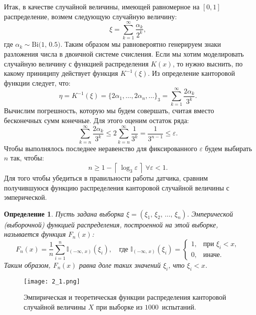 \documentclass[a4paper, 11pt]{article}
\theoremstyle{def}
\newtheorem{definition}{Определение}[section]
\theoremstyle{th}
\theoremstyle{rem}
\begin{document}
Итак, в качестве случайной величины, имеющей равномерное на $[0, 1]$ распределение, возмем следующую случайную величину:
$$
\xi = \sum\limits_{k=1}^{\infty}\frac{\alpha_k}{2^k},
$$
где $\alpha_k \sim \mbox{Bi(1, 0.5)}$. Таким образом мы равновероятно генерируем знаки разложения числа в двоичной системе счисления. Если мы хотим моделировать случайную величину с функцией распределения $K(x)$, то нужно выснить, по какому приниципу действует функция $K^{-1}(\xi)$. Из определение канторовой функции следует, что:
$$
\eta = K^{-1}(\xi) = \{2\alpha_1, \ldots, 2\alpha_n, \ldots\}_3 = \sum\limits_{k=1}^{\infty}\frac{2 \alpha_k}{3^k}.
$$
Вычислим погрешность, которую мы будем совершать, считая вместо бесконечных сумм конечные. Для этого оценим остаток ряда:
$$
        \sum_{k=n}^{\infty} \frac{2\alpha_k}{3^k} \leqslant 2\sum_{k=n}^{\infty}\frac{1}{3^k} = \frac{1}{3^{n-1}} \leqslant \varepsilon.
$$
Чтобы выполнялось последнее неравенство для фиксированного $\varepsilon$ будем выбирать $n$ так, чтобы:
$$
        n \geqslant 1 - \left\lceil\,\log_3 \varepsilon\,\right\rceil \; \forall \varepsilon < 1.
$$
Для того чтобы убедиться в правильности работы датчика, сравним получившуюся функцию распределения канторовой случайной величины с эмперической.
\begin{definition}
        Пусть задана выборка $\xi = (\xi_1,\,\xi_2,\,\ldots,\,\xi_n)$. \textit{Эмперической (выборочной) функцией распределения}, построенной на этой выборке, называется функция $F_n(x)$:
$$
        F_n(x) = \frac{1}{n}
        \sum_{i = 1}^n \mathbb{I}_{(-\infty,\,x)}(\xi_i),
        \quad
        \mbox{где }
        \mathbb{I}_{(-\infty,\,x)}(\xi_i)
        =
        \begin{cases}
                1, & \mbox{при } \xi_i < x, \\
                0, & \mbox{иначе.}
        \end{cases}
$$
Таким образом, $F_n(x)$ равна доле таких значений $\xi_i$, что $\xi_i < x$.
\end{definition}
\begin{figure}[H]
        \centering
        \texttt{[image: 2\_1.png]}
        \caption{Эмпирическая и теоретическая функции распределения канторовой случайной величины $X$ при выборке из $1000$~испытаний.}
\end{figure}
\end{document}
